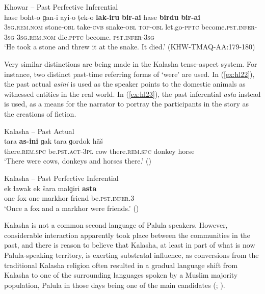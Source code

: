 \documentclass[output=paper]{langsci/langscibook}
\begin{document}
\begin{exe}
	\ex Khowar – Past Perfective Inferential \label{ex:hl21}\\
	\gll hase boht-o ɡan-i ayi-o ṭek-o \textbf{lak-iru} \textbf{bir-ai} hase \textbf{birdu} \textbf{bir-ai}\\
	3\textsc{sg}.\textsc{rem}.\textsc{nom} stone-\textsc{obl} take-\textsc{cvb} snake-\textsc{obl} \textsc{top}-\textsc{obl} let.go-\textsc{pptc} become.\textsc{pst}.\textsc{infer}-3\textsc{sg} 3\textsc{sg}.\textsc{rem}.\textsc{nom} die.\textsc{pptc} become. \textsc{pst}.\textsc{infer}-3\textsc{sg}\\
	 ‘He took a stone and threw it at the snake. It died.’ (KHW-TMAQ-AA:179-180) 
\end{exe}


Very similar distinctions are being made in the Kalasha tense-aspect system. For instance, two distinct past-time referring forms of ‘were’ are used. In ‎(\ref{ex:hl22}), the past actual \textit{asini} is used as the speaker points to the domestic animals as witnessed entities in the real world. In ‎(\ref{ex:hl23}), the past inferential \textit{asta} instead is used, as a means for the narrator to portray the participants in the story as the creations of fiction.

\begin{exe}
\ex Kalasha -- Past Actual \label{ex:hl22}\\
	\gll tara \textbf{as-ini} ɡak tara ɡordok hãš\\
	there.\textsc{rem}.\textsc{spc} be.\textsc{pst}.\textsc{act}-3\textsc{pl} cow there.\textsc{rem}.\textsc{spc} donkey horse\\
	\trans ‘There were cows, donkeys and horses there.’  (\citealt[136]{Heegard2015}) 
\end{exe}

\begin{exe}
\ex Kalasha -- Past Perfective Inferential \label{ex:hl23}\\
	\gll ek ɬawak ek  šara malɡiri \textbf{asta}\\
	one fox one markhor friend be.\textsc{pst}.\textsc{infer}.3\\
	\trans ‘Once a fox and a markhor were friends.’ (\citealt[182]{Heegard2015}) 
\end{exe}

Kalasha is not a common second language of Palula speakers. However, considerable interaction apparently took place between the communities in the past, and there is reason to believe that Kalasha, at least in part of what is now Palula-speaking territory, is exerting substratal influence, as conversions from the traditional Kalasha religion often resulted in a gradual language shift from Kalasha to one of the surrounding languages spoken by a Muslim majority population, Palula in those days being one of the main candidates (\citealt[117--118]{Cacopardo2001}; \citealt[55--60]{Decker1992}).
\end{document}
